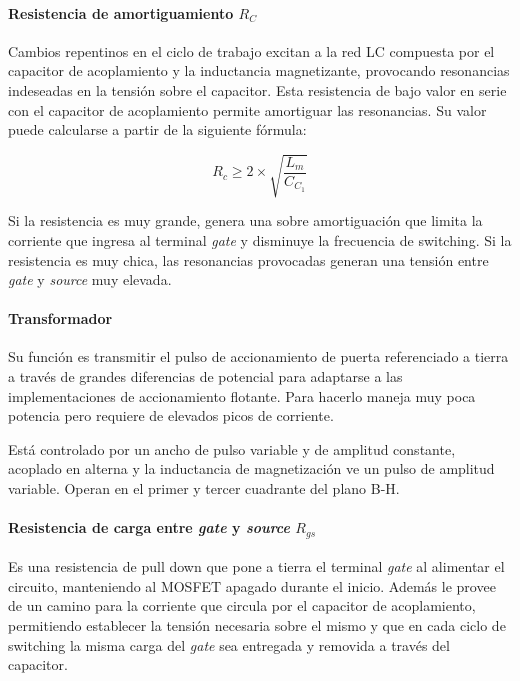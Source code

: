 
\paragraph{Resistencia de amortiguamiento $R_C$}

Cambios repentinos en el ciclo de trabajo excitan a la red LC compuesta por el capacitor de acoplamiento 
y la inductancia magnetizante, provocando resonancias indeseadas en la tensión sobre el capacitor. 
Esta resistencia de bajo valor en serie con el capacitor de acoplamiento permite amortiguar las resonancias. 
Su valor puede calcularse a partir de la siguiente fórmula:

$$ R_c\geq2\times\sqrt{\frac{L_m}{C_{C_1}}} $$

Si la resistencia es muy grande, genera una sobre amortiguación que limita la corriente que ingresa al terminal \textit{gate} y disminuye la frecuencia de switching. 
Si la resistencia es muy chica, las resonancias provocadas generan una tensión entre \textit{gate} y \textit{source} muy elevada.

\paragraph{Transformador}

Su función es transmitir el pulso de accionamiento de puerta referenciado a tierra a través de grandes diferencias de potencial para adaptarse a las implementaciones de accionamiento flotante. 
Para hacerlo maneja muy poca potencia pero requiere de elevados picos de corriente. 

Está controlado por un ancho de pulso variable y de amplitud constante,
acoplado en alterna y la inductancia de magnetización ve un pulso de amplitud variable.
Operan en el primer y tercer cuadrante del plano B-H.

\paragraph{Resistencia de carga entre \textit{gate} y \textit{source} $R_{gs}$}

Es una resistencia de pull down que pone a tierra el terminal \textit{gate} al alimentar el circuito, manteniendo al MOSFET apagado durante el inicio. 
Además le provee de un camino para la corriente que circula por el capacitor de acoplamiento, 
permitiendo establecer la tensión necesaria sobre el mismo y que en cada ciclo de switching 
la misma carga del \textit{gate} sea entregada y removida a través del capacitor. 

